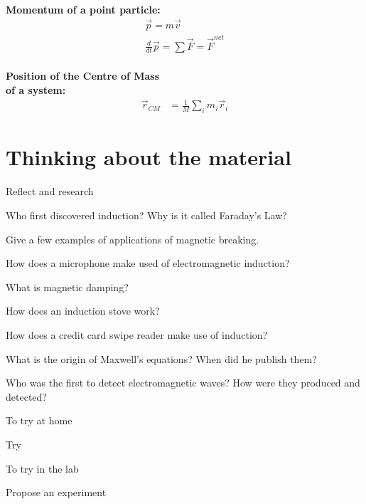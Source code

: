 \newpage
\begin{importantEquations}
\medskip
\begin{multicols}{2}
\textbf{Momentum of a point particle:}
\begin{align*}
\vec p = m\vec v \\
\frac{d}{dt}\vec p = \sum \vec F = \vec F^{net}
\end{align*}
\columnbreak
\\
\textbf{Position of the Centre of Mass \\ of a system:}
\begin{align*}
\vec r_{CM} &=\frac{1}{M}\sum_i m_i\vec r_i 
\end{align*}
\medskip
\end{multicols}
\end{importantEquations}

\newpage
\section{Thinking about the material}

\begin{chapteractivity}{Reflect and research}
{
\item Who first discovered induction? Why is it called Faraday's Law?
\item Give a few examples of applications of magnetic breaking.
\item How does a microphone make used of electromagnetic induction?
\item What is magnetic damping?
\item How does an induction stove work?
\item How does a credit card swipe reader make use of induction?
\item What is the origin of Maxwell's equations? When did he publish them?
\item Who was the first to detect electromagnetic waves? How were they produced and detected?
}
\end{chapteractivity}

\begin{chapteractivity}{To try at home}
{
\item Try
}
\end{chapteractivity}

\begin{chapteractivity}{To try in the lab}
{
\item Propose an experiment
}
\end{chapteractivity}

